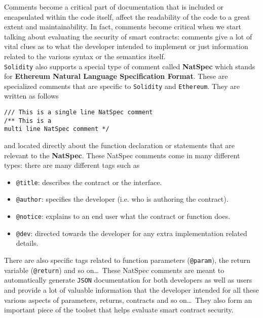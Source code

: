 Comments become a critical part of documentation that is included or encapsulated within the code itself, affect the readability of the code to a great extent and maintainability.
In fact, comments become critical when we start talking about evaluating the security of smart contracts: comments give a lot of vital clues as to what the developer intended to implement or just information related to the various syntax or the semantics itself.\\

\texttt{Solidity} also supports a special type of comment called \textbf{NatSpec} which stands for \textbf{Ethereum Natural Language Specification Format}.
These are specialized comments that are specific to \texttt{Solidity} and \texttt{Ethereum}.
They are written as follows

\begin{lstlisting}[language=Solidity, style=solStyle, caption={Example of NatSpec comments}]
/// This is a single line NatSpec comment
/** This is a 
multi line NatSpec comment */
\end{lstlisting}

and located directly about the function declaration or statements that are relevant to the \textbf{NatSpec}.
These NatSpec comments come in many different types: there are many different tags such as

\begin{itemize}

   \item\texttt{@title}: describes the contract or the interface.

   \item\texttt{@author}: specifies the developer (i.e. who is authoring the contract).

   \item\texttt{@notice}: explains to an end user what the contract or function does.

   \item\texttt{@dev}: directed towards the developer for any extra implementation related details.

\end{itemize}

There are also specific tags related to function parameters (\texttt{@param}), the return variable (\texttt{@return}) and so on\dots\,
These NatSpec comments are meant to automatically generate \texttt{JSON} documentation for both developers as well as users and provide a lot of valuable information that the developer intended for all these various aspects of parameters, returns, contracts and so on\dots\,
They also form an important piece of the toolset that helps evaluate smart contract security.

